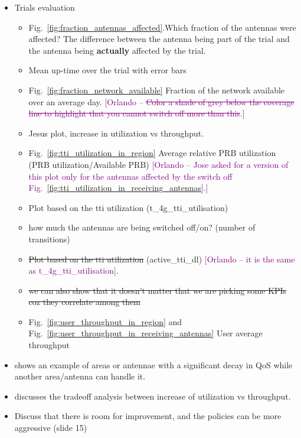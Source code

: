 \documentclass[10pt,sigconf,letterpaper,anonymous,nonacm]{acmart}
\newcommand{\om}[1]{\textcolor{purple}{[Orlando -- #1]}}
\begin{document}
\begin{itemize}
    \item Trials evaluation 
    \begin{itemize}
        \item \checkmark Fig.~\ref{fig:fraction_antennas_affected}.Which fraction of the antennas were affected? The difference between the antenna being part of the trial and the antenna being \textbf{actually} affected by the trial.
        
        \item Mean up-time over the trial with error bars
        
        \item \checkmark Fig.~\ref{fig:fraction_network_available} Fraction of the network available over an average day. \om{\st{Color a shade of grey below the coverage line to highlight that you cannot switch off more than this}.}
        
        \item Jesus plot, increase in utilization vs throughput.

        
        \item \checkmark Fig.~\ref{fig:tti_utilization_in_region} Average relative PRB utilization (PRB utilization/Available PRB) \om{Jose asked for a version of this plot only for the antennas affected by the switch off Fig.~\ref{fig:tti_utilization_in_receiving_antennas}.}

        
        \item Plot based on the tti utilization (t\_4g\_tti\_utilisation)
        
        \item how much the antennas are being switched off/on? (number of transitions)
        
        \item \st{Plot based on the tti utilization} (active\_tti\_dl) \om{it is the same as t\_4g\_tti\_utilisation}.
        
        \item \st{we can also show that it doesn't matter that we are picking some KPIs coz they correlate among them}
        
        \item \checkmark Fig.~\ref{fig:user_throughput_in_region} and Fig.~\ref{fig:user_throughput_in_receiving_antennas} User average throughput
    \end{itemize}

    \item shows an example of areas or antennae with a significant decay in QoS while another area/antenna can handle it.
    \item discusses the tradeoff analysis between increase of utilization vs throughput.
    \item Discuss that there is room for improvement, and the policies can be more aggressive (slide 15)
\end{itemize}
\end{document}
